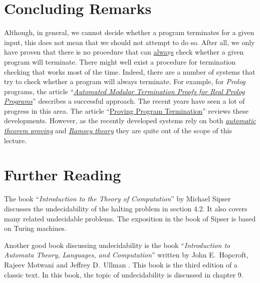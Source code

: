 \section{Concluding Remarks}
Although, in general, we cannot decide whether a program terminates for a given input, this does not mean
that we should not attempt to do so.  After all, we only have proven that there is no procedure that
can \underline{alwa}y\underline{s} check whether a given program will terminate.  There might well exist a
procedure for termination checking that works most of the time.  Indeed, there are a number of
systems that try to check whether a program will always terminate.  For example, for \textsl{Prolog}
programs, the article 
``\href{http://link.springer.com/chapter/10.1007%2F3-540-61739-6_44}{\emph{Automated Modular Termination Proofs for Real Prolog Programs}}''
\cite{mueller:1996} describes a successful approach.  The recent years have seen a lot of progress in
this area.  The article 
``\href{http://dl.acm.org/citation.cfm?id=1941509}{{Proving Program Termination}}''
\cite{cook:2011} reviews these developments.  However, as the recently developed systems rely on both
\href{http://en.wikipedia.org/wiki/Automated_theorem_proving}{\emph{automatic theorem proving}} and
\href{http://en.wikipedia.org/wiki/Ramsey_theory}{\emph{Ramsey theory}} they are quite out of the
scope of this lecture.

\section{Further Reading}
The book ``\emph{Introduction to the Theory of Computation}'' by Michael Sipser \cite{sipser:1996}
discusses the undecidability of the halting problem in section 4.2.  It also covers many related
undecidable problems.  The exposition in the book of Sipser is based on Turing machines.  

Another good book discussing undecidability is the book 
``\emph{Introduction to Automata Theory, Languages, and Computation}'' written by John E.~Hopcroft,
Rajeev Motwani and Jeffrey D.~Ullman \cite{hopcroft:06}.  This book is the third edition of a
classic text.  In this book, the topic of undecidability is discussed in chapter 9.



